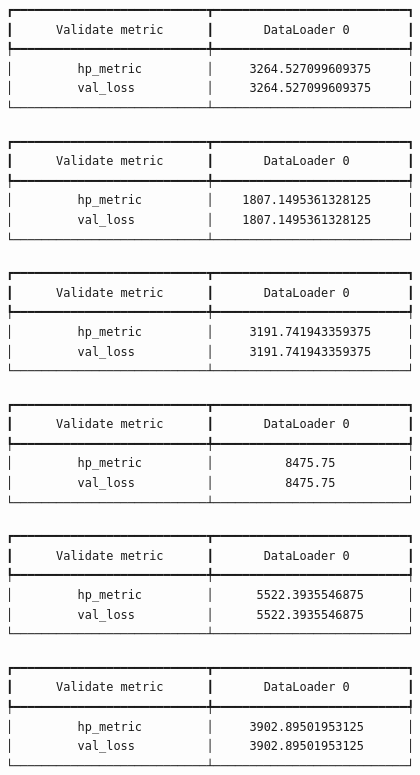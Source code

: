 \documentclass[
  letterpaper,
  DIV=11,
  numbers=noendperiod]{scrreprt}
\begin{document}
\begin{verbatim}
┏━━━━━━━━━━━━━━━━━━━━━━━━━━━┳━━━━━━━━━━━━━━━━━━━━━━━━━━━┓
┃      Validate metric      ┃       DataLoader 0        ┃
┡━━━━━━━━━━━━━━━━━━━━━━━━━━━╇━━━━━━━━━━━━━━━━━━━━━━━━━━━┩
│         hp_metric         │     3264.527099609375     │
│         val_loss          │     3264.527099609375     │
└───────────────────────────┴───────────────────────────┘
\end{verbatim}

\begin{verbatim}
┏━━━━━━━━━━━━━━━━━━━━━━━━━━━┳━━━━━━━━━━━━━━━━━━━━━━━━━━━┓
┃      Validate metric      ┃       DataLoader 0        ┃
┡━━━━━━━━━━━━━━━━━━━━━━━━━━━╇━━━━━━━━━━━━━━━━━━━━━━━━━━━┩
│         hp_metric         │    1807.1495361328125     │
│         val_loss          │    1807.1495361328125     │
└───────────────────────────┴───────────────────────────┘
\end{verbatim}

\begin{verbatim}
┏━━━━━━━━━━━━━━━━━━━━━━━━━━━┳━━━━━━━━━━━━━━━━━━━━━━━━━━━┓
┃      Validate metric      ┃       DataLoader 0        ┃
┡━━━━━━━━━━━━━━━━━━━━━━━━━━━╇━━━━━━━━━━━━━━━━━━━━━━━━━━━┩
│         hp_metric         │     3191.741943359375     │
│         val_loss          │     3191.741943359375     │
└───────────────────────────┴───────────────────────────┘
\end{verbatim}

\begin{verbatim}
┏━━━━━━━━━━━━━━━━━━━━━━━━━━━┳━━━━━━━━━━━━━━━━━━━━━━━━━━━┓
┃      Validate metric      ┃       DataLoader 0        ┃
┡━━━━━━━━━━━━━━━━━━━━━━━━━━━╇━━━━━━━━━━━━━━━━━━━━━━━━━━━┩
│         hp_metric         │          8475.75          │
│         val_loss          │          8475.75          │
└───────────────────────────┴───────────────────────────┘
\end{verbatim}

\begin{verbatim}
┏━━━━━━━━━━━━━━━━━━━━━━━━━━━┳━━━━━━━━━━━━━━━━━━━━━━━━━━━┓
┃      Validate metric      ┃       DataLoader 0        ┃
┡━━━━━━━━━━━━━━━━━━━━━━━━━━━╇━━━━━━━━━━━━━━━━━━━━━━━━━━━┩
│         hp_metric         │      5522.3935546875      │
│         val_loss          │      5522.3935546875      │
└───────────────────────────┴───────────────────────────┘
\end{verbatim}

\begin{verbatim}
┏━━━━━━━━━━━━━━━━━━━━━━━━━━━┳━━━━━━━━━━━━━━━━━━━━━━━━━━━┓
┃      Validate metric      ┃       DataLoader 0        ┃
┡━━━━━━━━━━━━━━━━━━━━━━━━━━━╇━━━━━━━━━━━━━━━━━━━━━━━━━━━┩
│         hp_metric         │     3902.89501953125      │
│         val_loss          │     3902.89501953125      │
└───────────────────────────┴───────────────────────────┘
\end{verbatim}
\end{document}
